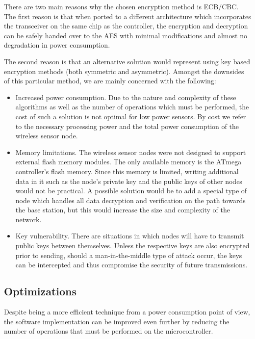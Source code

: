 There are two main reasons why the chosen encryption method is ECB/CBC. The first 
reason is that when ported to a different architecture which incorporates the 
transceiver on the same chip as the controller, the encryption and decryption can be safely 
handed over to the AES with minimal modifications and almost no degradation in 
power consumption.

The second reason is that an alternative solution would represent using key based 
encryption methods (both symmetric and asymmetric). Amongst the downsides of this 
particular method, we are mainly concerned with the following:

\begin{itemize}

\item Increased power consumption. Due to the nature and complexity of these algorithms 
as well as the number of operations which must be performed, the cost of such a 
solution is not optimal for low power sensors. By cost we refer to the necessary 
processing power and the total power consumption of the wireless sensor node.
\item Memory limitations. The wireless sensor nodes were not designed to support 
external flash memory modules. The only available memory is the ATmega controller's 
flash memory. Since this memory is limited, writing additional data in it such as 
the node's private key and the public keys of other nodes would not be practical.
A possible solution would be to add a special type of node which handles all data 
decryption and verification on the path towards the base station, but this would 
increase the size and complexity of the network.
\item Key vulnerability. There are situations in which nodes will have to transmit 
public keys between themselves. Unless the respective keys are also encrypted prior 
to sending, should a man-in-the-middle type of attack occur, the keys can be intercepted 
and thus compromise the security of future transmissions.

\end{itemize}

\subsection{Optimizations}

Despite being a more efficient technique from a power consumption point of view, the 
software implementation can be improved even further by reducing the number of operations 
that must be performed on the microcontroller.

